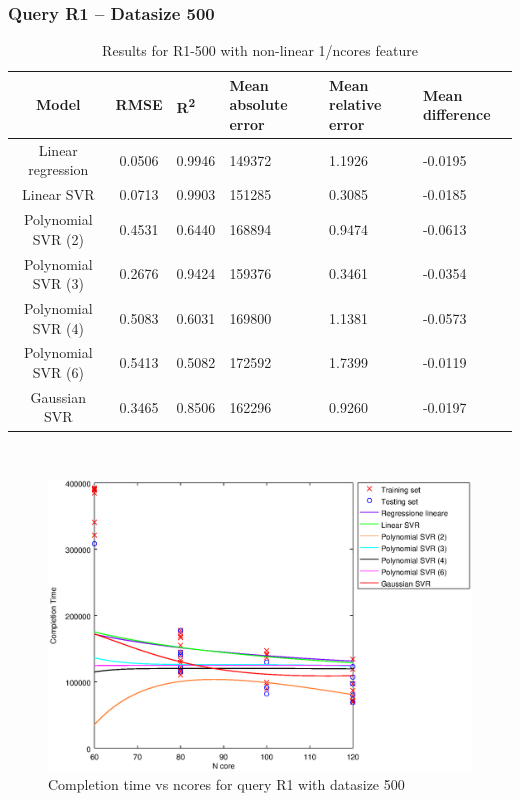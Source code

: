 \documentclass[a4paper,11pt]{article}
\begin{document}
\newpage
\subsubsection{Query R1 -- Datasize 500}
\begin{table}[H]
	\centering
	\begin{adjustbox}{center}
		\begin{tabular}{c | c M{1.2cm} M{2.5cm} M{2.5cm} M{1.8cm}}
			Model & RMSE & R\textsuperscript{2} & Mean absolute error & Mean relative error & Mean difference \tabularnewline
			\hline
			Linear regression & 0.0506 & 0.9946 & 149372 & 1.1926 & -0.0195 \\
			Linear SVR & 0.0713 & 0.9903 & 151285 & 0.3085 & -0.0185 \\
			Polynomial SVR (2) & 0.4531 & 0.6440 & 168894 & 0.9474 & -0.0613 \\
			Polynomial SVR (3) & 0.2676 & 0.9424 & 159376 & 0.3461 & -0.0354 \\
			Polynomial SVR (4) & 0.5083 & 0.6031 & 169800 & 1.1381 & -0.0573 \\
			Polynomial SVR (6) & 0.5413 & 0.5082 & 172592 & 1.7399 & -0.0119 \\
			Gaussian SVR & 0.3465 & 0.8506 & 162296 & 0.9260 & -0.0197 \\
		\end{tabular}
	\end{adjustbox}
	\\
	\caption{Results for R1-500 with non-linear 1/ncores feature}
	\label{table_R1_prediction_all}
\end{table}

\begin {figure}[hbtp]
\centering
\includegraphics[width=\textwidth]{output/R1_500_1_OVER_NCORES/plot_R1_500.eps}
\caption {Completion time vs ncores for query R1 with datasize 500}
\end {figure}
\end{document}
